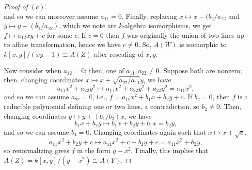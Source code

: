 \documentclass[12pt,letterpaper]{article}
\theoremstyle{definition}
\theoremstyle{remark}
\numberwithin{equation}{section}
\numberwithin{figure}{problem}
\begin{document}
\begin{proof}[Proof of
  $(c)$]
\begin{equation*}
  \end{equation*}
  and so we can moreover assume
  $a_{11} =
  0$.
  Finally, replacing
  $x \mapsto x -
  (b_2/a_{12}$ and
  $y \mapsto y -
  (b_1/a_{12})$, which we note are
  $k$-algebra isomorphisms, we get
  $f \mapsto a_{12}xy +
  c$ for some
  $c$.
  If
  $c =
  0$ then
  $f$ was originally the union of two lines up to affine transformation, hence we have
  $c \ne
  0$.
  So,
  $A(W)$ is isomorphic to
  $k[x,y]/(xy - 1) \cong
  A(Z)$ after rescaling of
  $x,y$.
  \par Now consider when
  $a_{12} =
  0$; then, one of
  $a_{11},a_{22} \ne
  0$.
  Suppose both are nonzero; then, changing coordinates
  $x \mapsto x +
  \sqrt{a_{22}/a_{11}}y$, we have
  \begin{equation*}
    a_{11}x^2 + a_{22}y^2 \mapsto a_{11}x^2 + a_{22}y^2 + a_{22}y^2 = a_{11}x^2,
  \end{equation*}
  and so we can assume
  $a_{22} =
  0$, i.e.,
  $f = a_{11}x^2 + b_1x + b_2y +
  c$.
  If
  $b_2 =
  0$, then
  $f$ is a reducible polynomial defining one or two lines, a contradiction, so
  $b_2 \ne
  0$.
  Then, changing coordinates
  $y \mapsto y +
  (b_1/b_2)x$, we have
  \begin{equation*}
    b_1x + b_2y \mapsto b_1x + b_2y + b_1x = b_2y,
  \end{equation*}
  and so we can assume
  $b_1 =
  0$.
  Changing coordinates again such that
  $x \mapsto x +
  \sqrt{c}$,
  \begin{equation*}
    a_{11}x^2 + b_2y + c \mapsto a_{11}x^2 + c + b_2y + c = a_{11}x^2 + b_2y,
  \end{equation*}
  so renormalizing gives
  $f$ in the form
  $y -
  x^2$.
  Finally, this implies that
  $A(Z) = k[x,y]/(y-x^2) \cong
  A(Y)$.
\end{proof}
\end{document}
